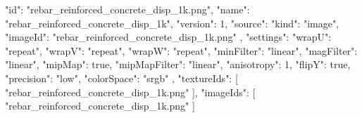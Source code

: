 {
  "id": "rebar_reinforced_concrete_disp_1k.png",
  "name": "rebar_reinforced_concrete_disp_1k",
  "version": 1,
  "source": {
    "kind": "image",
    "imageId": "rebar_reinforced_concrete_disp_1k.png"
  },
  "settings": {
    "wrapU": "repeat",
    "wrapV": "repeat",
    "wrapW": "repeat",
    "minFilter": "linear",
    "magFilter": "linear",
    "mipMap": true,
    "mipMapFilter": "linear",
    "anisotropy": 1,
    "flipY": true,
    "precision": "low",
    "colorSpace": "srgb"
  },
  "textureIds": [
    "rebar_reinforced_concrete_disp_1k.png"
  ],
  "imageIds": [
    "rebar_reinforced_concrete_disp_1k.png"
  ]
}
